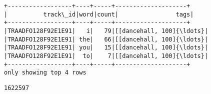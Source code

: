 \documentclass[11pt]{article}
\makeatletter
\newcommand{\boxspacing}{\kern\kvtcb@left@rule\kern\kvtcb@boxsep}
\newcommand{\prompt}[4]{
        {\ttfamily\llap{{\color{#2}[#3]:\hspace{3pt}#4}}\vspace{-\baselineskip}}
    }
\makeatother
\begin{document}
    \begin{Verbatim}[commandchars=\\\{\}]
+------------------+----+-----+--------------------+
|          track\_id|word|count|                tags|
+------------------+----+-----+--------------------+
|TRAADFO128F92E1E91|   i|   79|[[dancehall, 100]{\ldots}|
|TRAADFO128F92E1E91| the|   66|[[dancehall, 100]{\ldots}|
|TRAADFO128F92E1E91| you|   15|[[dancehall, 100]{\ldots}|
|TRAADFO128F92E1E91|  to|    7|[[dancehall, 100]{\ldots}|
+------------------+----+-----+--------------------+
only showing top 4 rows

    \end{Verbatim}

            \begin{tcolorbox}[breakable, size=fbox, boxrule=.5pt, pad at break*=1mm, opacityfill=0]
\prompt{Out}{outcolor}{5}{\boxspacing}
\begin{Verbatim}[commandchars=\\\{\}]
1622597
\end{Verbatim}
\end{tcolorbox}
        
\end{document}
